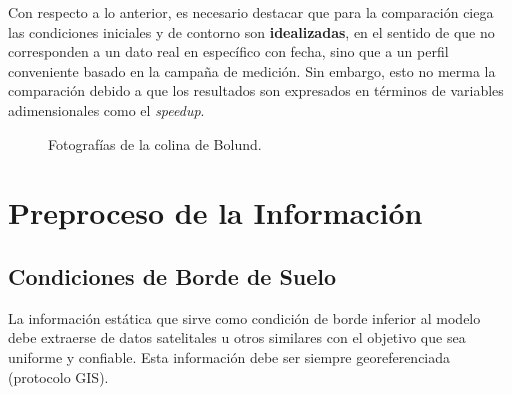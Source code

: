Con respecto a lo anterior, es necesario destacar que para la comparación ciega las condiciones iniciales y de contorno  son \textbf{idealizadas}, en el sentido de que no corresponden a un dato real en específico con fecha, sino que a un perfil conveniente basado en la campaña de medición. Sin embargo, esto no merma la comparación debido a que los resultados son expresados en términos de variables adimensionales como el \emph{speedup}.

\begin{figure}[H]
	\centering{}%
	\caption{Fotografías de la colina de Bolund.}
	\label{fig:05_terreno_bolund}
\end{figure}

\newpage
\section{Preproceso de la Información}
\subsection{Condiciones de Borde de Suelo}
La información estática que sirve como condición de borde inferior al modelo debe extraerse de datos satelitales u otros similares con el objetivo que sea uniforme y confiable. Esta información debe ser siempre georeferenciada (protocolo GIS).

